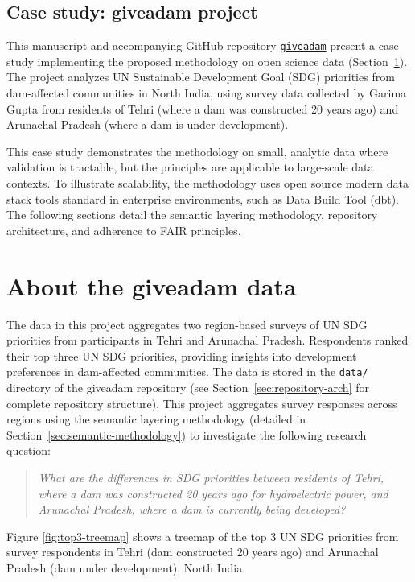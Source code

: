 \documentclass{article}
\begin{document}
\subsection{Case study: giveadam project}

This manuscript and accompanying GitHub repository \href{https://github.com/softloud/giveadam}{\texttt{giveadam}} present a case study implementing the proposed methodology on open science data (Section~\ref{sec:aboutdata}). The project analyzes UN Sustainable Development Goal (SDG) priorities from dam-affected communities in North India, using survey data collected by Garima Gupta from residents of Tehri (where a dam was constructed 20 years ago) and Arunachal Pradesh (where a dam is under development).

This case study demonstrates the methodology on small, analytic data where validation is tractable, but the principles are applicable to large-scale data contexts. To illustrate scalability, the methodology uses open source modern data stack tools standard in enterprise environments, such as Data Build Tool (dbt). The following sections detail the semantic layering methodology, repository architecture, and adherence to FAIR principles.

\section{About the giveadam data}
\label{sec:aboutdata}

The data in this project aggregates two region-based surveys of UN SDG priorities from participants in Tehri and Arunachal Pradesh. Respondents ranked their top three UN SDG priorities, providing insights into development preferences in dam-affected communities. The data is stored in the \texttt{data/} directory of the giveadam repository (see Section~\ref{sec:repository-arch} for complete repository structure). This project aggregates survey responses across regions using the semantic layering methodology (detailed in Section~\ref{sec:semantic-methodology}) to investigate the following research question:

\begin{quote}
  \textit{What are the differences in SDG priorities between residents of Tehri, where a dam was constructed 20 years ago for hydroelectric power, and Arunachal Pradesh, where a dam is currently being developed?}
\end{quote}

Figure \ref{fig:top3-treemap} shows a treemap of the top 3 UN SDG priorities from survey respondents in Tehri (dam constructed 20 years ago) and Arunachal Pradesh (dam under development), North India.
\end{document}
